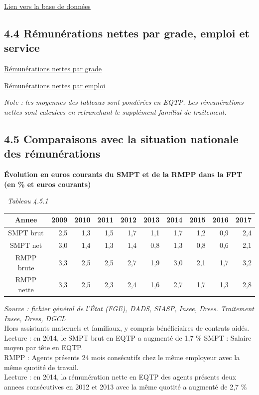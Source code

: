 \href{../Bases/Remunerations/Anavar.synthese.csv}{Lien vers la base de
données}

\hypertarget{remunerations-nettes-par-grade-emploi-et-service}{%
\subsection{4.4 Rémunérations nettes par grade, emploi et
service}\label{remunerations-nettes-par-grade-emploi-et-service}}

\href{../Bases/Remunerations/net.grades.csv}{Rémunérations nettes par
grade}

\href{../Bases/Remunerations/net.emplois.csv}{Rémunérations nettes par
emploi}

\emph{Note : les moyennes des tableaux sont pondérées en EQTP. Les
rémunérations nettes sont calculees en retranchant le supplément
familial de traitement.}

\hypertarget{comparaisons-avec-la-situation-nationale-des-remunerations}{%
\subsection{4.5 Comparaisons avec la situation nationale des
rémunérations}\label{comparaisons-avec-la-situation-nationale-des-remunerations}}

\textbf{Évolution en euros courants du SMPT et de la RMPP dans la FPT
(en \% et euros courants)}

~\emph{Tableau 4.5.1}

\begin{longtable}[]{@{}crrrrrrrrr@{}}
\toprule
Annee & 2009 & 2010 & 2011 & 2012 & 2013 & 2014 & 2015 & 2016 &
2017\tabularnewline
\midrule
\endhead
SMPT brut & 2,5 & 1,3 & 1,5 & 1,7 & 1,1 & 1,7 & 1,2 & 0,9 &
2,4\tabularnewline
SMPT net & 3,0 & 1,4 & 1,3 & 1,4 & 0,8 & 1,3 & 0,8 & 0,6 &
2,1\tabularnewline
RMPP brute & 3,3 & 2,5 & 2,5 & 2,7 & 1,9 & 3,0 & 2,1 & 1,7 &
3,2\tabularnewline
RMPP nette & 3,3 & 2,5 & 2,3 & 2,4 & 1,6 & 2,7 & 1,7 & 1,3 &
2,8\tabularnewline
\bottomrule
\end{longtable}

\emph{Source : fichier général de l'État (FGE), DADS, SIASP, Insee,
Drees. Traitement Insee, Drees, DGCL}\\
Hors assistants maternels et familiaux, y compris bénéficiaires de
contrats aidés.\\
Lecture : en 2014, le SMPT brut en EQTP a augmenté de 1,7 \% SMPT :
Salaire moyen par tête en EQTP.\\
RMPP : Agents présents 24 mois consécutifs chez le même employeur avec
la même quotité de travail.\\
Lecture : en 2014, la rémunération nette en EQTP des agents présents
deux annees consécutives en 2012 et 2013 avec la même quotité a augmenté
de 2,7 \%

